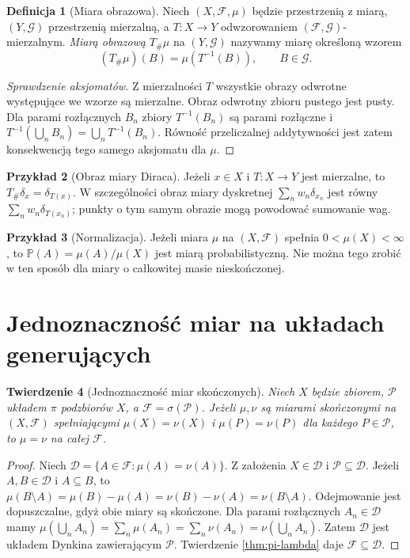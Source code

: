 \documentclass[11pt,a4paper,oneside]{book}
\numberwithin{equation}{chapter}
\theoremstyle{plain}
\newtheorem{twierdzenie}{Twierdzenie}[chapter]
\theoremstyle{definition}
\newtheorem{definicja}[twierdzenie]{Definicja}
\newtheorem{przyklad}[twierdzenie]{Przykład}
\theoremstyle{remark}
\begin{document}
\begin{definicja}[Miara obrazowa]
\label{def:pushforward}
Niech $(X,\mathcal F,\mu)$ będzie przestrzenią z miarą,
$(Y,\mathcal G)$ przestrzenią mierzalną, a
$T:X\to Y$ odwzorowaniem $(\mathcal F,\mathcal G)$-mierzalnym.
\emph{Miarą obrazową} $T_\#\mu$ na $(Y,\mathcal G)$ nazywamy
miarę określoną wzorem
\[
(T_\#\mu)(B)=\mu(T^{-1}(B)),\qquad B\in\mathcal G.
\]
\end{definicja}

\begin{proof}[Sprawdzenie aksjomatów]
Z mierzalności $T$ wszystkie obrazy odwrotne występujące
we wzorze są mierzalne. Obraz odwrotny zbioru pustego
jest pusty. Dla parami rozłącznych $B_n$ zbiory
$T^{-1}(B_n)$ są parami rozłączne i
$T^{-1}(\bigcup_nB_n)=\bigcup_nT^{-1}(B_n)$.
Równość przeliczalnej addytywności jest zatem konsekwencją
tego samego aksjomatu dla $\mu$.
\end{proof}

\begin{przyklad}[Obraz miary Diraca]
Jeżeli $x\in X$ i $T:X\to Y$ jest mierzalne, to
$T_\#\delta_x=\delta_{T(x)}$.
W szczególności obraz miary dyskretnej
$\sum_nw_n\delta_{x_n}$ jest równy
$\sum_nw_n\delta_{T(x_n)}$; punkty o tym samym obrazie
mogą powodować sumowanie wag.
\end{przyklad}

\begin{przyklad}[Normalizacja]
Jeżeli miara $\mu$ na $(X,\mathcal F)$ spełnia
$0<\mu(X)<\infty$, to $\mathbb P(A)=\mu(A)/\mu(X)$
jest miarą probabilistyczną. Nie można tego zrobić
w ten sposób dla miary o całkowitej masie nieskończonej.
\end{przyklad}

\section{Jednoznaczność miar na układach generujących}

\begin{twierdzenie}[Jednoznaczność miar skończonych]
\label{thm:uniqueness-finite}
Niech $X$ będzie zbiorem, $\mathcal P$ układem $\pi$
podzbiorów $X$, a $\mathcal F=\sigma(\mathcal P)$.
Jeżeli $\mu,\nu$ są miarami skończonymi na $(X,\mathcal F)$
spełniającymi $\mu(X)=\nu(X)$ i
$\mu(P)=\nu(P)$ dla każdego $P\in\mathcal P$,
to $\mu=\nu$ na całej $\mathcal F$.
\end{twierdzenie}
\begin{proof}
Niech $\mathcal D=\{A\in\mathcal F:\mu(A)=\nu(A)\}$.
Z założenia $X\in\mathcal D$ i $\mathcal P\subseteq\mathcal D$.
Jeżeli $A,B\in\mathcal D$ i $A\subseteq B$, to
$\mu(B\setminus A)=\mu(B)-\mu(A)
=\nu(B)-\nu(A)=\nu(B\setminus A)$.
Odejmowanie jest dopuszczalne, gdyż obie miary są skończone.
Dla parami rozłącznych $A_n\in\mathcal D$ mamy
$\mu(\bigcup_nA_n)=\sum_n\mu(A_n)
=\sum_n\nu(A_n)=\nu(\bigcup_nA_n)$.
Zatem $\mathcal D$ jest układem Dynkina zawierającym
$\mathcal P$. Twierdzenie \ref{thm:pi-lambda} daje
$\mathcal F\subseteq\mathcal D$.
\end{proof}
\end{document}
